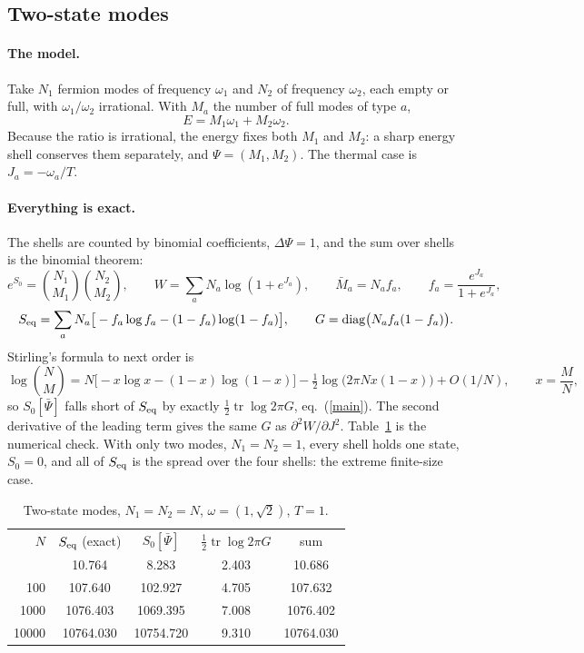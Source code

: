 \documentclass[11pt,aps,preprint,nofootinbib,superscriptaddress,tightenlines]{revtex4-2}
\def\st{\begin{equation}}
\def\stp{\end{equation}}
\def\Eq#1{eq.~(\ref{#1})}
\def\tr{\operatorname{tr}}
\let\oldparagraph\paragraph
\renewcommand{\paragraph}{\par\bigskip\oldparagraph}
\begin{document}
\subsection{Two-state modes}
\label{sec:fermi}

\paragraph{The model.}  Take $N_1$ fermion modes of frequency $\omega_1$ and $N_2$ of frequency $\omega_2$, each empty or full, with
$\omega_1/\omega_2$ irrational.  With $M_a$ the number of full modes of type $a$,
\st
E=M_1\omega_1+M_2\omega_2 .
\stp
Because the ratio is irrational, the energy fixes both $M_1$ and $M_2$: a sharp energy shell conserves them separately, and
$\Psi=(M_1,M_2)$.  The thermal case is $J_a=-\omega_a/T$.

\paragraph{Everything is exact.}  The shells are counted by binomial coefficients, $\Delta\Psi=1$, and the sum over shells is the binomial theorem:
\st
e^{S_0}=\binom{N_1}{M_1}\binom{N_2}{M_2},\qquad W=\sum_aN_a\log(1+e^{J_a}),\qquad \bar M_a=N_af_a,\qquad f_a=\frac{e^{J_a}}{1+e^{J_a}},
\stp
\st
S_{\rm eq}=\sum_aN_a\big[-f_a\log f_a-(1-f_a)\log(1-f_a)\big],\qquad G=\mathrm{diag}\big(N_af_a(1-f_a)\big) .
\stp
Stirling's formula to next order is
\st
\log\binom NM=N\big[-x\log x-(1-x)\log(1-x)\big]-\tfrac12\log\big(2\pi Nx(1-x)\big)+O(1/N),\qquad x=\frac MN,
\stp
so $S_0[\bar\Psi]$ falls short of $S_{\rm eq}$ by exactly $\tfrac12\tr\log2\pi G$, \Eq{main}.  The second derivative of the leading term gives the
same $G$ as $\partial^2W/\partial J^2$.  Table~\ref{tab:fermi} is the numerical check.  With only two modes, $N_1=N_2=1$, every shell holds one state,
$S_0=0$, and all of $S_{\rm eq}$ is the spread over the four shells: the extreme finite-size case.

\begin{table}[h]
\caption{Two-state modes, $N_1=N_2=N$, $\omega=(1,\sqrt2)$, $T=1$.}
\label{tab:fermi}
\begin{ruledtabular}
\begin{tabular}{rcccc}
$N$ & $S_{\rm eq}$ (exact) & $S_0[\bar\Psi]$ & $\tfrac12\tr\log2\pi G$ & sum \\
\colrule
10 & 10.764 & 8.283 & 2.403 & 10.686 \\
100 & 107.640 & 102.927 & 4.705 & 107.632 \\
1000 & 1076.403 & 1069.395 & 7.008 & 1076.402 \\
10000 & 10764.030 & 10754.720 & 9.310 & 10764.030 \\
\end{tabular}
\end{ruledtabular}
\end{table}
\end{document}
